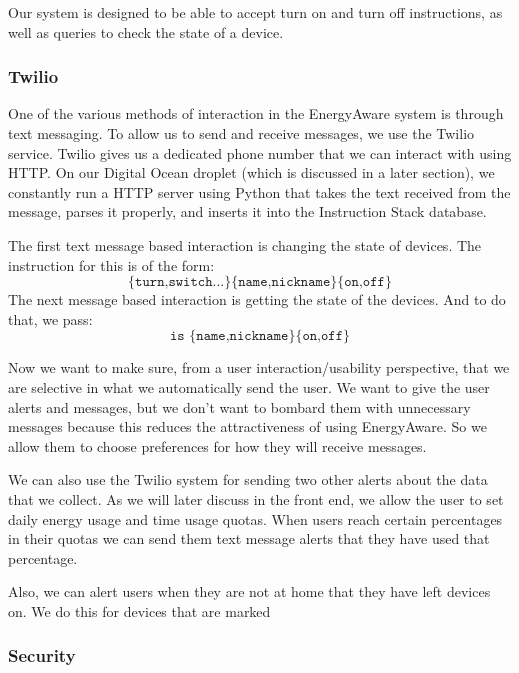 \documentclass{sig-alternate-05-2015}
\begin{document}
Our system is designed to be able to accept turn on and turn off instructions, as well as queries to check the state of a device.

\subsubsection{Twilio}

One of the various methods of interaction in the EnergyAware system is through text messaging. To allow us to send and receive messages, we use the Twilio service. Twilio gives us a dedicated phone number that we can interact with using HTTP. On our Digital Ocean droplet (which is discussed in a later section), we constantly run a HTTP server using Python that takes the text received from the message, parses it properly, and inserts it into the Instruction Stack database.

The first text message based interaction is changing the state of devices. The instruction for this is of the form:
\begin{equation*}
\texttt{\{turn,switch...\} \{name,nickname\} \{on,off\}} 
\end{equation*}
The next message based interaction is getting the state of the devices. And to do that, we pass:
\begin{equation*}
	\texttt{is \{name,nickname\} \{on,off\}} 
\end{equation*}

Now we want to make sure, from a user interaction/usability perspective, that we are selective in what we automatically send the user. We want to give the user alerts and messages, but we don't want to bombard them with unnecessary messages because this reduces the attractiveness of using EnergyAware. So we allow them to choose preferences for how they will receive messages.

We can also use the Twilio system for sending two other alerts about the data that we collect. As we will later discuss in the front end, we allow the user to set daily energy usage and time usage quotas. When users reach certain percentages in their quotas we can send them text message alerts that they have used that percentage.

Also, we can alert users when they are not at home that they have left devices on. We do this for devices that are marked 

\subsubsection{Security}
\end{document}
